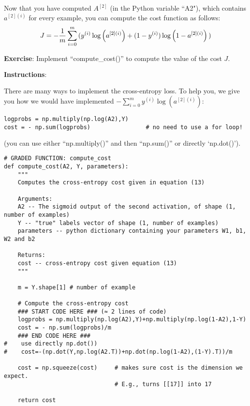 Now that you have computed $A^{[2]}$ (in the Python variable ``A2"), which contains $a^{[2](i)}$ for every example, you can compute the cost function as follows:
\begin{equation}
J = - \frac{1}{m} \sum\limits_{i = 0}^{m} \large{(} \small y^{(i)}\log\left(a^{[2] (i)}\right) + (1-y^{(i)})\log\left(1- a^{[2] (i)}\right) \large{)} \small
\end{equation}

{\textbf {Exercise}}: Implement ``compute\_cost()'' to compute the value of the cost $J$.

{\textbf {Instructions}}:

There are many ways to implement the cross-entropy loss. To help you, we give you how we would have implemented
$- \sum\limits_{i=0}^{m}  y^{(i)}\log(a^{[2](i)})$:

\begin{verbatim}
logprobs = np.multiply(np.log(A2),Y)
cost = - np.sum(logprobs)                # no need to use a for loop!
\end{verbatim}

(you can use either ``np.multiply()'' and then ``np.sum()'' or directly `np.dot()').

\begin{verbatim}
# GRADED FUNCTION: compute_cost
def compute_cost(A2, Y, parameters):
    """
    Computes the cross-entropy cost given in equation (13)
    
    Arguments:
    A2 -- The sigmoid output of the second activation, of shape (1, number of examples)
    Y -- "true" labels vector of shape (1, number of examples)
    parameters -- python dictionary containing your parameters W1, b1, W2 and b2
    
    Returns:
    cost -- cross-entropy cost given equation (13)
    """
    
    m = Y.shape[1] # number of example

    # Compute the cross-entropy cost
    ### START CODE HERE ### (≈ 2 lines of code)
    logprobs = np.multiply(np.log(A2),Y)+np.multiply(np.log(1-A2),1-Y)
    cost = - np.sum(logprobs)/m
    ### END CODE HERE ###
#    use directly np.dot())
#    cost=-(np.dot(Y,np.log(A2.T))+np.dot(np.log(1-A2),(1-Y).T))/m
    
    cost = np.squeeze(cost)     # makes sure cost is the dimension we expect. 
                                # E.g., turns [[17]] into 17 
    
    return cost
\end{verbatim}


